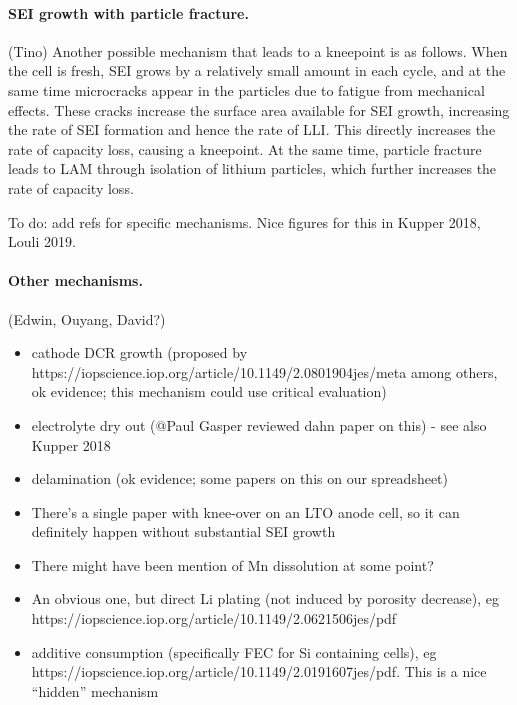 \documentclass{article}
\begin{document}
	


\paragraph{SEI growth with particle fracture.} (Tino)
Another possible mechanism that leads to a kneepoint is as follows.
When the cell is fresh, SEI grows by a relatively small amount in each cycle, and at the same time microcracks appear in the particles due to fatigue from mechanical effects.
These cracks increase the surface area available for SEI growth, increasing the rate of SEI formation and hence the rate of LLI.
This directly increases the rate of capacity loss, causing a kneepoint.
At the same time, particle fracture leads to LAM through isolation of lithium particles, which further increases the rate of capacity loss.

To do: add refs for specific mechanisms.
Nice figures for this in Kupper 2018, Louli 2019.

\paragraph{Other mechanisms.} (Edwin, Ouyang, David?)
\begin{itemize}
    \item cathode DCR growth (proposed by https://iopscience.iop.org/article/10.1149/2.0801904jes/meta among others, ok evidence; this mechanism could use critical evaluation)
    \item electrolyte dry out (@Paul Gasper reviewed dahn paper on this) - see also Kupper 2018 \cite{kupper_end--life_2018}
    \item delamination (ok evidence; some papers on this on our spreadsheet)
    \item There's a single paper with knee-over on an LTO anode cell, so it can definitely happen without substantial SEI growth
    \item There might have been mention of Mn dissolution at some point?
    \item An obvious one, but direct Li plating (not induced by porosity decrease), eg https://iopscience.iop.org/article/10.1149/2.0621506jes/pdf
    \item additive consumption (specifically FEC for Si containing cells), eg https://iopscience.iop.org/article/10.1149/2.0191607jes/pdf. This is a nice “hidden” mechanism
\end{itemize}
\end{document}
